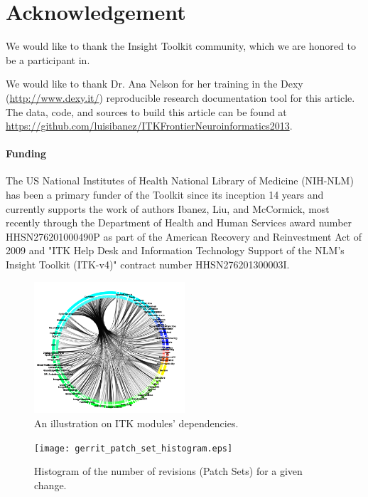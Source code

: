 \documentclass{frontiersENG} %
\begin{document}
\section*{Acknowledgement}

We would like to thank the Insight Toolkit community, which we are honored to
be a participant in.

We would like to thank Dr. Ana Nelson for her training in the Dexy
(\url{http://www.dexy.it/}) reproducible research documentation tool for this
article.  The data, code, and sources to build this article can be found at
\url{https://github.com/luisibanez/ITKFrontierNeuroinformatics2013}.

\paragraph{Funding\textcolon} The US National Institutes of Health National
Library of Medicine (NIH-NLM) has been a primary funder of the Toolkit since
its inception 14 years and currently supports the work of authors Ibanez, Liu,
and McCormick, most recently through the Department of Health and Human
Services award number HHSN276201000490P as part of the American Recovery and
Reinvestment Act of 2009 and "ITK Help Desk and Information Technology Support
of the NLM's Insight Toolkit (ITK-v4)" contract number HHSN276201300003I.





\begin{figure}
  \centering
    \includegraphics[width=0.5\textwidth]{itk_module_dependency.png}
    \caption{An illustration on ITK modules' dependencies.}
    \label{fig:itk_module_dependency}
\end{figure}

\begin{figure}
  \centering
    \texttt{[image: gerrit\_patch\_set\_histogram.eps]}
    \caption{Histogram of the number of revisions (Patch Sets) for a given change.}
    \label{fig:gerrit_patch_set_histogram}
\end{figure}
\end{document}
